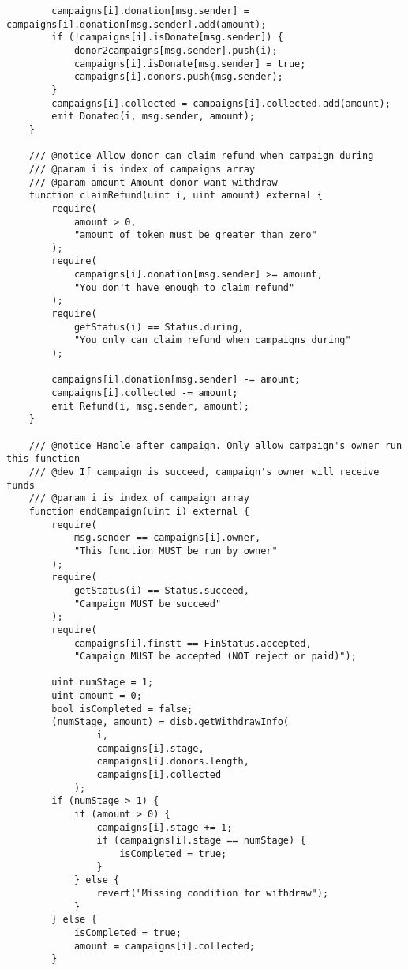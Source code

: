 \documentclass[../main-report.tex]{subfiles}
\begin{document}
\begin{lstlisting}
        campaigns[i].donation[msg.sender] = campaigns[i].donation[msg.sender].add(amount);
        if (!campaigns[i].isDonate[msg.sender]) {
            donor2campaigns[msg.sender].push(i);
            campaigns[i].isDonate[msg.sender] = true;
            campaigns[i].donors.push(msg.sender);
        }
        campaigns[i].collected = campaigns[i].collected.add(amount);
        emit Donated(i, msg.sender, amount);
    }

    /// @notice Allow donor can claim refund when campaign during
    /// @param i is index of campaigns array
    /// @param amount Amount donor want withdraw
    function claimRefund(uint i, uint amount) external {
        require(
            amount > 0,
            "amount of token must be greater than zero"
        );
        require(
            campaigns[i].donation[msg.sender] >= amount,
            "You don't have enough to claim refund"
        );
        require(
            getStatus(i) == Status.during,
            "You only can claim refund when campaigns during"
        );

        campaigns[i].donation[msg.sender] -= amount;
        campaigns[i].collected -= amount;
        emit Refund(i, msg.sender, amount);
    }

    /// @notice Handle after campaign. Only allow campaign's owner run this function
    /// @dev If campaign is succeed, campaign's owner will receive funds
    /// @param i is index of campaign array
    function endCampaign(uint i) external {
        require(
            msg.sender == campaigns[i].owner,
            "This function MUST be run by owner"
        );
        require(
            getStatus(i) == Status.succeed,
            "Campaign MUST be succeed"
        );
        require(
            campaigns[i].finstt == FinStatus.accepted,
            "Campaign MUST be accepted (NOT reject or paid)");

        uint numStage = 1;
        uint amount = 0;
        bool isCompleted = false;
        (numStage, amount) = disb.getWithdrawInfo(
                i,
                campaigns[i].stage,
                campaigns[i].donors.length,
                campaigns[i].collected
            );
        if (numStage > 1) {
            if (amount > 0) {
                campaigns[i].stage += 1;
                if (campaigns[i].stage == numStage) {
                    isCompleted = true;
                }
            } else {
                revert("Missing condition for withdraw");
            }
        } else {
            isCompleted = true;
            amount = campaigns[i].collected;
        }


\end{lstlisting}
\end{document}
